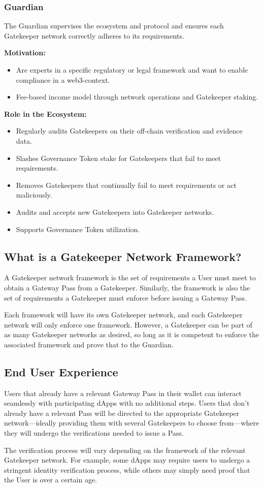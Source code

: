 \subsubsection{Guardian}
The Guardian supervises the ecosystem and protocol and ensures each Gatekeeper network correctly adheres to its requirements.

\vspace{1em}

\textbf{Motivation:}
\begin{itemize}
\item Are experts in a specific regulatory or legal framework and want to enable compliance in a web3-context.
\item Fee-based income model through network operations and Gatekeeper staking.
\end{itemize}

\textbf{Role in the Ecosystem:}
\begin{itemize}
\item Regularly audits Gatekeepers on their off-chain verification and evidence data.
\item Slashes Governance Token stake for Gatekeepers that fail to meet requirements.
\item Removes Gatekeepers that continually fail to meet requirements or act maliciously.
\item Audits and accepts new Gatekeepers into Gatekeeper networks.
\item Supports Governance Token utilization.
\end{itemize}

\subsection{What is a Gatekeeper Network Framework?}
A Gatekeeper network framework is the set of requirements a User must meet to obtain a Gateway Pass from a Gatekeeper. Similarly, the framework is also the set of requirements a Gatekeeper must enforce before issuing a Gateway Pass.

Each framework will have its own Gatekeeper network, and each Gatekeeper network will only enforce one framework. However, a Gatekeeper can be part of as many Gatekeeper networks as desired, so long as it is competent to enforce the associated framework and prove that to the Guardian.

\subsection{End User Experience}
Users that already have a relevant Gateway Pass in their wallet can interact seamlessly with participating dApps with no additional steps. Users that don’t already have a relevant Pass will be directed to the appropriate Gatekeeper network—ideally providing them with several Gatekeepers to choose from—where they will undergo the verifications needed to issue a Pass.

The verification process will vary depending on the framework of the relevant Gatekeeper network. For example, some dApps may require users to undergo a stringent identity verification process, while others may simply need proof that the User is over a certain age.\\
